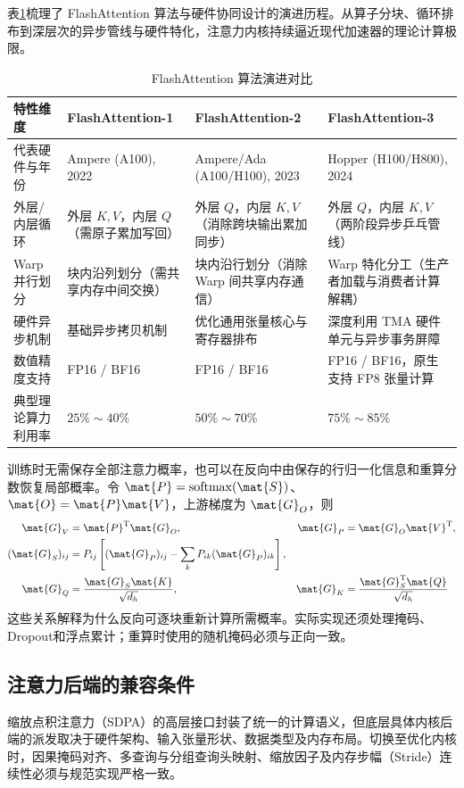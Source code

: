 \documentclass[../textbook.tex]{subfiles}
\begin{document}
表\ref{tab:flashattention-evolution}梳理了 FlashAttention 算法与硬件协同设计的演进历程。从算子分块、循环排布到深层次的异步管线与硬件特化，注意力内核持续逼近现代加速器的理论计算极限。

\begin{table}[htbp]
\centering
\caption{FlashAttention 算法演进对比}\label{tab:flashattention-evolution}
\begin{tabularx}{\linewidth}{@{}lXXX@{}}
\toprule
特性维度 & FlashAttention-1 & FlashAttention-2 & FlashAttention-3 \\
\midrule
代表硬件与年份 & Ampere (A100), 2022 & Ampere/Ada (A100/H100), 2023 & Hopper (H100/H800), 2024 \\
外层/内层循环 & 外层 $K,V$，内层 $Q$（需原子累加写回） & 外层 $Q$，内层 $K,V$（消除跨块输出累加同步） & 外层 $Q$，内层 $K,V$（两阶段异步乒乓管线） \\
Warp 并行划分 & 块内沿列划分（需共享内存中间交换） & 块内沿行划分（消除 Warp 间共享内存通信） & Warp 特化分工（生产者加载与消费者计算解耦） \\
硬件异步机制 & 基础异步拷贝机制 & 优化通用张量核心与寄存器排布 & 深度利用 TMA 硬件单元与异步事务屏障 \\
数值精度支持 & FP16 / BF16 & FP16 / BF16 & FP16 / BF16，原生支持 FP8 张量计算 \\
典型理论算力利用率 & $25\%\sim 40\%$ & $50\%\sim 70\%$ & $75\%\sim 85\%$ \\
\bottomrule
\end{tabularx}
\end{table}

训练时无需保存全部注意力概率，也可以在反向中由保存的行归一化信息和重算分数恢复局部概率。令 $\mat{P}=\operatorname{softmax}(\mat{S})$、$\mat{O}=\mat{P}\mat{V}$，上游梯度为 $\mat{G}_O$，则
\begin{align}
 \mat{G}_V&=\mat{P}^{\mathrm{T}}\mat{G}_O,&\mat{G}_P&=\mat{G}_O\mat{V}^{\mathrm{T}},\\
 (\mat{G}_S)_{ij}&=P_{ij}\left[(\mat{G}_P)_{ij}-\sum_kP_{ik}(\mat{G}_P)_{ik}\right],\\
 \mat{G}_Q&=\frac{\mat{G}_S\mat{K}}{\sqrt{d_h}},&\mat{G}_K&=\frac{\mat{G}_S^{\mathrm{T}}\mat{Q}}{\sqrt{d_h}}
\end{align}
这些关系解释为什么反向可逐块重新计算所需概率。实际实现还须处理掩码、Dropout和浮点累计；重算时使用的随机掩码必须与正向一致。

\subsection{注意力后端的兼容条件}
缩放点积注意力（SDPA）的高层接口封装了统一的计算语义，但底层具体内核后端的派发取决于硬件架构、输入张量形状、数据类型及内存布局。切换至优化内核时，因果掩码对齐、多查询与分组查询头映射、缩放因子及内存步幅（Stride）连续性必须与规范实现严格一致。
\end{document}
